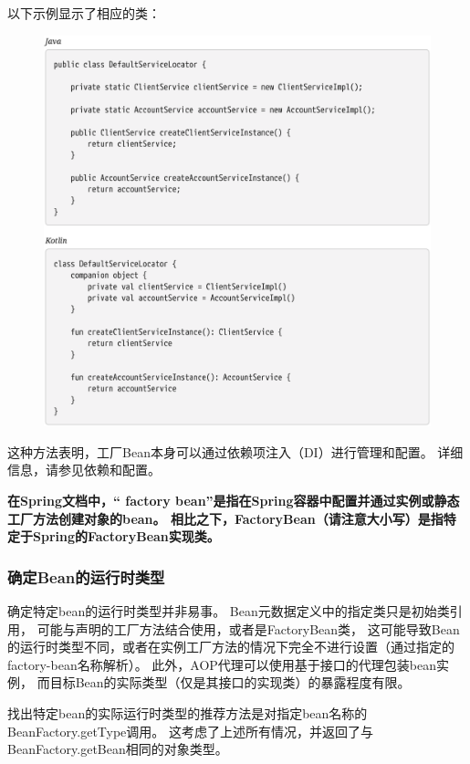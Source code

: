 \newpage
以下示例显示了相应的类：
\begin{figure}[ht]
    \centering
    \includegraphics[width=1\linewidth]{./Figure/IMG_code_20.png}
\end{figure}

这种方法表明，工厂Bean本身可以通过依赖项注入（DI）进行管理和配置。 
详细信息，请参见依赖和配置。

\textbf{在Spring文档中，“ factory bean”是指在Spring容器中配置并通过实例或静态工厂方法创建对象的bean。 相比之下，FactoryBean（请注意大小写）是指特定于Spring的FactoryBean实现类。}

\subsubsection{确定Bean的运行时类型}
确定特定bean的运行时类型并非易事。
 Bean元数据定义中的指定类只是初始类引用，
 可能与声明的工厂方法结合使用，或者是FactoryBean类，
 这可能导致Bean的运行时类型不同，或者在实例工厂方法的情况下完全不进行设置（通过指定的factory-bean名称解析）。
此外，AOP代理可以使用基于接口的代理包装bean实例，
而目标Bean的实际类型（仅是其接口的实现类）的暴露程度有限。

找出特定bean的实际运行时类型的推荐方法是对指定bean名称的BeanFactory.getType调用。 
这考虑了上述所有情况，并返回了与BeanFactory.getBean相同的对象类型。

